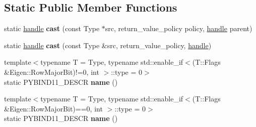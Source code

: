 \subsection*{Static Public Member Functions}
\begin{DoxyCompactItemize}
\item 
static \hyperlink{classhandle}{handle} {\bfseries cast} (const Type $\ast$src, return\+\_\+value\+\_\+policy policy, \hyperlink{classhandle}{handle} parent)\hypertarget{structtype__caster_3_01_type_00_01typename_01std_1_1enable__if_3_01is__eigen__sparse_3_01_type_01_4_1_1value_01_4_1_1type_01_4_aa7db2fb4c9674543ac2dcf8d69ccee22}{}\label{structtype__caster_3_01_type_00_01typename_01std_1_1enable__if_3_01is__eigen__sparse_3_01_type_01_4_1_1value_01_4_1_1type_01_4_aa7db2fb4c9674543ac2dcf8d69ccee22}

\item 
static \hyperlink{classhandle}{handle} {\bfseries cast} (const Type \&src, return\+\_\+value\+\_\+policy, \hyperlink{classhandle}{handle})\hypertarget{structtype__caster_3_01_type_00_01typename_01std_1_1enable__if_3_01is__eigen__sparse_3_01_type_01_4_1_1value_01_4_1_1type_01_4_a60a9b0c124d4333d30b95eed8b844785}{}\label{structtype__caster_3_01_type_00_01typename_01std_1_1enable__if_3_01is__eigen__sparse_3_01_type_01_4_1_1value_01_4_1_1type_01_4_a60a9b0c124d4333d30b95eed8b844785}

\item 
{\footnotesize template$<$typename T  = Type, typename std\+::enable\+\_\+if$<$(\+T\+::\+Flags \&\+Eigen\+::\+Row\+Major\+Bit)!=0, int $>$\+::type  = 0$>$ }\\static P\+Y\+B\+I\+N\+D11\+\_\+\+D\+E\+S\+CR {\bfseries name} ()\hypertarget{structtype__caster_3_01_type_00_01typename_01std_1_1enable__if_3_01is__eigen__sparse_3_01_type_01_4_1_1value_01_4_1_1type_01_4_ae625224009418ad9dbb819a81dd3abc1}{}\label{structtype__caster_3_01_type_00_01typename_01std_1_1enable__if_3_01is__eigen__sparse_3_01_type_01_4_1_1value_01_4_1_1type_01_4_ae625224009418ad9dbb819a81dd3abc1}

\item 
{\footnotesize template$<$typename T  = Type, typename std\+::enable\+\_\+if$<$(\+T\+::\+Flags \&\+Eigen\+::\+Row\+Major\+Bit)==0, int $>$\+::type  = 0$>$ }\\static P\+Y\+B\+I\+N\+D11\+\_\+\+D\+E\+S\+CR {\bfseries name} ()\hypertarget{structtype__caster_3_01_type_00_01typename_01std_1_1enable__if_3_01is__eigen__sparse_3_01_type_01_4_1_1value_01_4_1_1type_01_4_ae625224009418ad9dbb819a81dd3abc1}{}\label{structtype__caster_3_01_type_00_01typename_01std_1_1enable__if_3_01is__eigen__sparse_3_01_type_01_4_1_1value_01_4_1_1type_01_4_ae625224009418ad9dbb819a81dd3abc1}

\end{DoxyCompactItemize}
